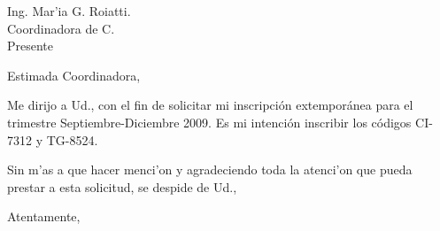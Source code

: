 \documentclass[]{letter}
\begin{document}
\pagestyle{empty}

\begin{letter}
\name{}
\date{Sartenejas, 21 de Septiembre de 2009}
\opening{Ing. Mar'ia G. Roiatti. \\ Coordinadora de C. \\ Presente}

Estimada Coordinadora,

Me dirijo a Ud., con el fin de solicitar mi inscripción extemporánea para el
trimestre Septiembre-Diciembre 2009. Es mi intención inscribir los códigos
CI-7312 y TG-8524.

Sin m'as a que hacer menci'on y agradeciendo toda la atenci'on que pueda prestar
a esta solicitud, se despide de Ud.,

\closing{Atentamente,}

\end{letter}
\end{document}
